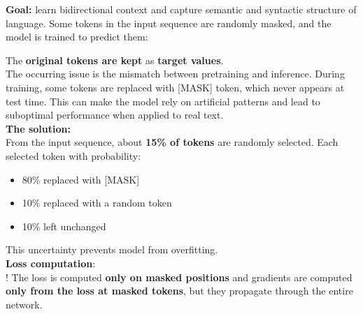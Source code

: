 \documentclass[10pt]{article}
\begin{document}
\textbf{Goal:} learn bidirectional context and capture semantic and syntactic structure of language.
Some tokens in the input sequence are randomly masked, and the model is trained to predict them: 

\begin{center}
\end{center}

The \textbf{original tokens are kept} as \textbf{target values}.\\


The occurring issue is the mismatch between pretraining and inference. During training, some tokens are replaced with [MASK] token, which never appears at test time. This can make the model rely on artificial patterns and lead to suboptimal performance when applied to real text. \\

 \textbf{The solution:} \\
From the input sequence, about \textbf{15\% of tokens} are randomly selected. Each selected token with probability:
\begin{itemize}
    \item[-] 80\% replaced with [MASK] 
    \item[-] 10\%  replaced with a random token
    \item[-] 10\% left unchanged
\end{itemize}

This uncertainty prevents model from overfitting. \\

\textbf{Loss computation}:  \\
! The loss is computed \textbf{only on masked positions} and gradients are computed \textbf{only from the loss at masked tokens}, but they propagate through the entire network.
\\
\end{document}
